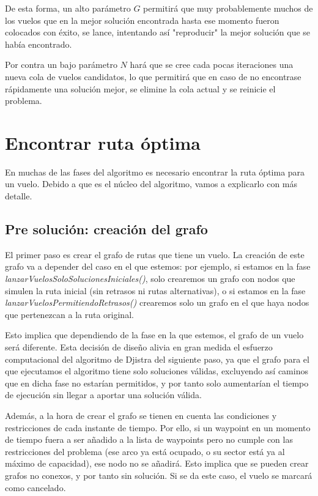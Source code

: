 De esta forma, un alto parámetro $G$ permitirá que muy probablemente muchos de los vuelos que en la mejor solución encontrada hasta ese momento fueron colocados con éxito, se lance, intentando así "reproducir" la mejor solución que se había encontrado. 

Por contra un bajo parámetro $N$ hará que se cree cada pocas iteraciones una nueva cola de vuelos candidatos, lo que permitirá que en caso de no encontrase rápidamente una solución mejor, se elimine la cola actual y se reinicie el problema.


\section{Encontrar ruta óptima}
En muchas de las fases del algoritmo es necesario encontrar la ruta óptima para un vuelo. Debido a que es el núcleo del algoritmo, vamos a explicarlo con más detalle.
\subsection{Pre solución: creación del grafo}
El primer paso es crear el grafo de rutas que tiene un vuelo. La creación de este grafo va a depender del caso en el que estemos: por ejemplo, si estamos en la fase \textit{lanzarVuelosSoloSolucionesIniciales()}, solo crearemos un grafo con nodos que simulen la ruta inicial (sin retrasos ni rutas alternativas), o si estamos en la fase \textit{lanzarVuelosPermitiendoRetrasos()} crearemos solo un grafo en el que haya nodos  que pertenezcan a la ruta original.

Esto implica que dependiendo de la fase en la que estemos, el grafo de un vuelo será diferente. Esta decisión de diseño alivia en gran medida el esfuerzo computacional del algoritmo de  Djistra del siguiente paso, ya que el grafo para el que ejecutamos el algoritmo tiene solo soluciones válidas, excluyendo así caminos que en dicha fase no estarían permitidos, y por tanto solo aumentarían el tiempo de ejecución sin llegar a aportar una solución válida.

Además, a la hora de crear el grafo se tienen en cuenta las condiciones y restricciones de cada instante de tiempo. Por ello, si un waypoint en un momento de tiempo fuera a ser añadido a la lista de waypoints pero no cumple con las restricciones del problema (ese arco ya está ocupado, o su sector está ya al máximo de capacidad), ese nodo no se añadirá. Esto implica que se pueden crear grafos no conexos, y por tanto sin solución. Si se da este caso, el vuelo se marcará como cancelado.

